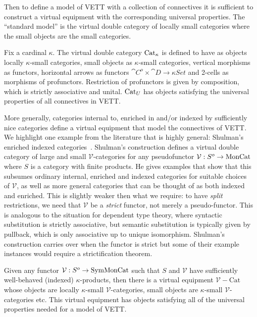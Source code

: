 \documentclass{llncs}
\begin{document}
%

Then to define a model of VETT with a collection of connectives it is
sufficient to construct a virtual equipment with the corresponding
universal properties.
%
The ``standard model'' is the virtual double category of locally
small categories where the small objects are the small categories.
\begin{construction}
  Fix a cardinal $\kappa$. The virtual double category $\textrm{Cat}_{\kappa}$
  is defined to have as objects locally $\kappa$-small categories,
  small objects as $\kappa$-small categories, vertical morphisms as
  functors, horizontal arrows as functors $\cat C^o \times \cat D \to
  \kappa Set$ and 2-cells as morphisms of profunctors. Restriction of
  profunctors is given by composition, which is strictly associative
  and unital.  $\textrm{Cat}_{U}$ has objects satisfying the universal
  properties of all connectives in VETT.
\end{construction}

More generally, categories internal to, enriched in and/or indexed by
sufficiently nice categories define a virtual equipment that model the
connectives of VETT. We highlight one example from the literature that
is highly general: Shulman's enriched indexed
categories~\cite{Shulman13}. Shulman's construction defines a virtual
double category of large and small $\mathcal V$-categories for any
pseudofunctor $\mathcal V : S^o \to \textrm{MonCat}$ where $S$ is a category
with finite products. He gives examples that show that this subsumes
ordinary internal, enriched and indexed categories for suitable choices
of $\mathcal V$, as well as more general categories that can be thought
of as both indexed and enriched.
%
This is slightly weaker then what we require: to have
\emph{split} restrictions, we need that $\mathcal V$ be a
\emph{strict} functor, not merely a pseudo-functor.
%
This is analogous to the situation for dependent type theory, where
syntactic substitution is strictly associative, but semantic
substitution is typically given by pullback, which is only associative
up to unique isomorphism.
%
Shulman's construction carries over when the functor is strict but
some of their example instances would require a strictification
theorem.
\begin{construction}
  Given any functor $\mathcal V : S^o \to \textrm{SymMonCat}$ such that $S$
  and $\mathcal V$ have sufficiently well-behaved (indexed)
  $\kappa$-products, then there is a virtual equipment $\mathcal
  V-\textrm{Cat}$ whose objects are locally $\kappa$-small $\mathcal
  V$-categories, small objects are $\kappa$-small $\mathcal
  V$-categories etc. This virtual equipment has objects satisfying all
  of the universal properties needed for a model of VETT.
\end{construction}
\end{document}
